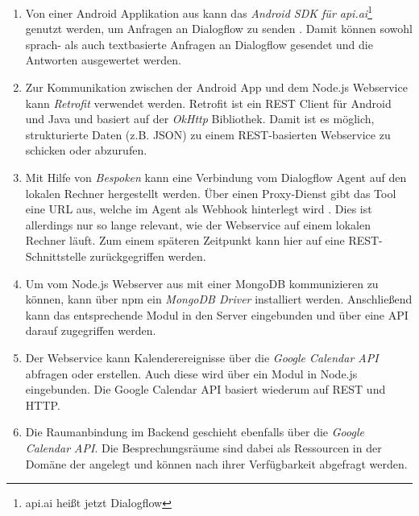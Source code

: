 \begin{enumerate}
  \item Von einer Android Applikation aus kann das \textit{Android \ac{SDK} für api.ai}\footnote{api.ai heißt jetzt Dialogflow} genutzt werden, um Anfragen an Dialogflow zu senden \cite{skachkov_dialogflow-android-client:_2018}. Damit können sowohl sprach- als auch textbasierte Anfragen an Dialogflow gesendet und die Antworten ausgewertet werden. 
  
  \item Zur Kommunikation zwischen der Android App und dem Node.js Webservice kann \textit{Retrofit} verwendet werden. Retrofit ist ein \ac{REST} Client für Android und Java und basiert auf der \textit{OkHttp} Bibliothek. Damit ist es möglich, strukturierte Daten (z.B. \ac{JSON}) zu einem \ac{REST}-basierten Webservice zu schicken oder abzurufen. \cite{vogel_using_2018} 
  
  \item Mit Hilfe von \textit{Bespoken} kann eine Verbindung vom Dialogflow Agent auf den lokalen Rechner hergestellt werden. Über einen Proxy-Dienst gibt das Tool eine \ac{URL} aus, welche im Agent als Webhook hinterlegt wird \cite{bespoken_api.ai_2018}. Dies ist allerdings nur so lange relevant, wie der Webservice auf einem lokalen Rechner läuft. Zum einem späteren Zeitpunkt kann hier auf eine \ac{REST}-Schnittstelle zurückgegriffen werden. 
  
  \item Um vom Node.js Webserver aus mit einer MongoDB kommunizieren zu können, kann über \ac{npm} ein \textit{MongoDB Driver} installiert werden. Anschließend kann das entsprechende Modul in den Server eingebunden und über eine \ac{API} darauf zugegriffen werden. \cite{npmjs_mongodb_2018}
  
  \item Der Webservice kann Kalenderereignisse über die \textit{Google Calendar \ac{API}} abfragen oder erstellen. Auch diese wird über ein Modul in Node.js eingebunden. Die Google Calendar \ac{API} basiert wiederum auf \ac{REST} und \ac{HTTP}. \cite{google_developers_node.js_2018}
  
  \item Die Raumanbindung im Backend geschieht ebenfalls über die \textit{Google Calendar \ac{API}}. Die Besprechungsräume sind dabei als Ressourcen in der Domäne der \mbox{\adorsys} angelegt und können nach ihrer Verfügbarkeit abgefragt werden.
  
\end{enumerate}

